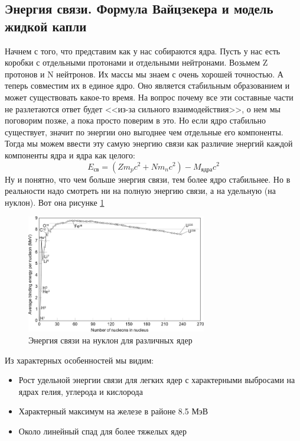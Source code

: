 \documentclass[12pt]{article}
\begin{document}
\subsection{Энергия связи. Формула Вайцзекера и модель жидкой капли}
Начнем с того, что представим как у нас собираются ядра. Пусть у нас есть коробки с отдельными протонами и отдельными нейтронами. Возьмем Z протонов и N нейтронов. Их массы мы знаем с очень хорошей точностью. А теперь совместим их в единое ядро. Оно является стабильным образованием и может существовать какое-то время. На вопрос почему все эти составные части не разлетаются ответ будет <<из-за сильного взаимодействия>>, о нем мы поговорим позже, а пока просто поверим в это. Но если ядро стабильно существует, значит по энергии оно выгоднее чем отдельные его компоненты. Тогда мы можем ввести эту самую энергию связи как различие энергий каждой компоненты ядра и ядра как целого:
\begin{equation}
    E_{\text{св}} = (Z m_pc^2 + N m_nc^2) - M_{\text{ядра}}c^2
\end{equation}
Ну и понятно, что чем больше энергия связи, тем более ядро стабильнее. Но в реальности надо смотреть ни на полную энергию связи, а на удельную (на нуклон). Вот она рисунке \ref{fig:sem_09_link_energy} 
\begin{figure}[h]
    \centering
    \includegraphics[width=0.7\textwidth,height=\textheight,keepaspectratio]{Seminar_09/pics/pic_binding_energy.png}
    \caption{Энергия связи на нуклон для различных ядер}
    \label{fig:sem_09_link_energy}
\end{figure}
Из характерных особенностей мы видим:
\begin{itemize}
    \item Рост удельной энергии связи для легких ядер с характерными выбросами на ядрах гелия, углерода и кислорода
    \item Характерный максимум на железе в районе 8.5 МэВ
    \item Около линейный спад для более тяжелых ядер
\end{itemize}
\end{document}
